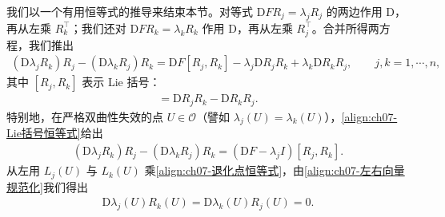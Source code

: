 \documentclass[../../main.tex]{subfiles}
\begin{document}
我们以一个有用恒等式的推导来结束本节。对等式 $\mathrm{D}F R_j=\lambda_j R_j$ 的两边作用 $\mathrm{D}$，再从左乘 $R_k^\top$；我们还对 $\mathrm{D}F R_k=\lambda_k R_k$ 作用 $\mathrm{D}$，再从左乘 $R_j^\top$。合并所得两方程，我们推出
\begin{align}
(\mathrm{D}\lambda_j R_k)R_j-(\mathrm{D}\lambda_k R_j)R_k=\mathrm{D}F[R_j,R_k]-\lambda_j\mathrm{D}R_j R_k+\lambda_k\mathrm{D}R_k R_j,\qquad j,k=1,\cdots,n,
\label{align:ch07-Lie括号恒等式}
\end{align}
其中 $[R_j,R_k]$ 表示 Lie 括号：
\begin{align}
[R_j,R_k]=\mathrm{D}R_j R_k-\mathrm{D}R_k R_j.
\label{align:ch07-Lie括号定义}
\end{align}
特别地，在严格双曲性失效的点 $U\in\mathscr{O}$（譬如 $\lambda_j(U)=\lambda_k(U)$），\eqref{align:ch07-Lie括号恒等式}给出
\begin{align}
(\mathrm{D}\lambda_j R_k)R_j-(\mathrm{D}\lambda_k R_j)R_k=(\mathrm{D}F-\lambda_j I)[R_j,R_k].
\label{align:ch07-退化点恒等式}
\end{align}
从左用 $L_j(U)$ 与 $L_k(U)$ 乘\eqref{align:ch07-退化点恒等式}，由\eqref{align:ch07-左右向量规范化}我们得出
\begin{align}
\mathrm{D}\lambda_j(U)R_k(U)=\mathrm{D}\lambda_k(U)R_j(U)=0.
\label{align:ch07-退化点Dlambda}
\end{align}
\end{document}
